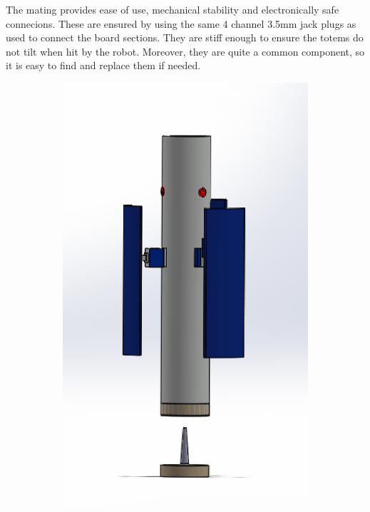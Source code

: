 \documentclass[a4paper,twoside]{book}
\begin{document}
The mating provides ease of use, mechanical stability and electronically safe connecions.
These are ensured by using the same 4 channel 3.5mm jack plugs as used to connect the board sections.
They are stiff enough to ensure the totems do not tilt when hit by the robot.
Moreover, they are quite a common component, so it is easy to find and replace them if needed.

\begin{figure}
    \begin{subfigure}[b]{0.4\textwidth}
    \includegraphics[width=\textwidth]{img/totem_nuovo2}

\end{subfigure}
\end{figure}
\end{document}
